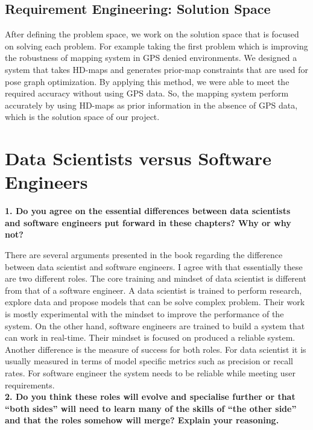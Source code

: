 \documentclass{article}
\begin{document}
\subsection{Requirement Engineering: Solution Space}

After defining the problem space, we work on the solution space that is focused on solving each problem. For example taking the first problem which is improving the robustness of mapping system in GPS denied environments. We designed a system that takes HD-maps and generates prior-map constraints that are used for pose graph optimization. By applying this method, we were able to meet the required accuracy without using GPS data. So, the mapping system perform accurately by using HD-maps as prior information in the absence of GPS data, which is the solution space of our project. 



\section{Data Scientists versus Software Engineers}

\textbf{1. Do you agree on the essential differences between data scientists and
 software engineers put forward in these chapters? Why or why not?}

There are several arguments presented in the book regarding the difference between data scientist and software engineers. I agree with that essentially these are two different roles. The core training and mindset of  data scientist is different from that of a software engineer. A data scientist is trained to perform research, explore data and propose models that can be solve complex problem. Their work is mostly experimental with the mindset to improve the performance of the system. On the other hand, software engineers are trained to build a system that can work in real-time. Their mindset is focused on produced a reliable system. Another difference is the measure of success for both roles. For data scientist it is usually measured in terms of model specific metrics such as precision or recall rates. For software engineer the system needs to be reliable while meeting user requirements.
\\

\noindent
\textbf{2. Do you think these roles will evolve and specialise further or that “both
 sides” will need to learn many of the skills of “the other side” and that the
 roles somehow will merge? Explain your reasoning.}
\end{document}
